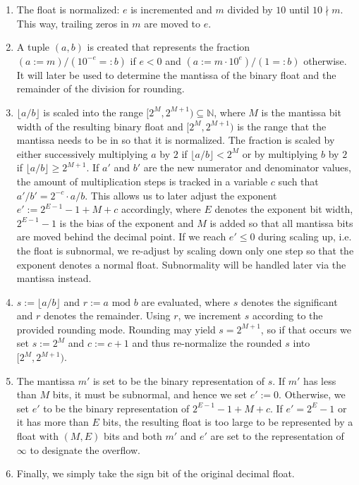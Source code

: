 \documentclass[a4paper,UKenglish,cleveref, autoref, thm-restate]{lipics-v2019}
\begin{document}
\begin{enumerate}
	\item The float is normalized: $e$ is incremented and $m$ divided by $10$ until $10 \nmid m$. This way, trailing zeros in $m$ are moved to $e$.
	\item A tuple $(a, b)$ is created that represents the fraction $(a := m) / (10^{-e} =: b)$ if $e < 0$ and $(a := m \cdot 10^e) / (1 =: b)$ otherwise. It will later be used to determine the mantissa of the binary float and the remainder of the division for rounding.
	\item $\lfloor a / b \rfloor$ is scaled into the range $[2^M, 2^{M+1}) \subseteq \mathbb{N}$, where $M$ is the mantissa bit width of the resulting binary float and $[2^M, 2^{M+1})$ is the range that the mantissa needs to be in so that it is normalized. The fraction is scaled by either successively multiplying $a$ by $2$ if $\lfloor a / b \rfloor < 2^M$ or by multiplying $b$ by $2$ if $\lfloor a / b \rfloor \geq 2^{M+1}$. If $a'$ and $b'$ are the new numerator and denominator values, the amount of multiplication steps is tracked in a variable $c$ such that $a' / b' = 2^{-c} \cdot a / b$. This allows us to later adjust the exponent $e' := 2^{E-1}-1 + M + c$ accordingly, where $E$ denotes the exponent bit width, $2^{E-1}-1$ is the bias of the exponent and $M$ is added so that all mantissa bits are moved behind the decimal point. If we reach $e' \leq 0$ during scaling up, i.e. the float is subnormal, we re-adjust by scaling down only one step so that the exponent denotes a normal float. Subnormality will be handled later via the mantissa instead.
	\item $s := \lfloor a / b \rfloor$ and $r := a \text{ mod } b$ are evaluated, where $s$ denotes the significant and $r$ denotes the remainder. Using $r$, we increment $s$ according to the provided rounding mode. Rounding may yield $s = 2^{M+1}$, so if that occurs we set $s := 2^M$ and $c := c + 1$ and thus re-normalize the rounded $s$ into $[2^M, 2^{M+1})$.
	\item The mantissa $m'$ is set to be the binary representation of $s$. If $m'$ has less than $M$ bits, it must be subnormal, and hence we set $e' := 0$. Otherwise, we set $e'$ to be the binary representation of $2^{E-1}-1 + M + c$. If $e' = 2^E - 1$ or it has more than $E$ bits, the resulting float is too large to be represented by a float with $(M, E)$ bits and both $m'$ and $e'$ are set to the representation of $\infty$ to designate the overflow.
	\item Finally, we simply take the sign bit of the original decimal float.
\end{enumerate}
\end{document}
